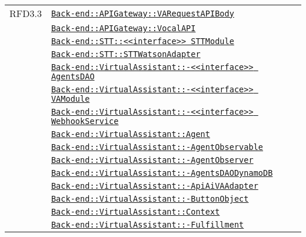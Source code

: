 \begin{longtable}{|>{\centering}m{3cm}|m{10cm}<{\centering}|}
RFD3.3 & \hyperref[Back-end::APIGateway::VARequestAPIBody]{\texttt{Back-end::APIGateway::VARequestAPIBody}}\\
& \hyperref[Back-end::APIGateway::VocalAPI]{\texttt{Back-end::APIGateway::VocalAPI}}\\
& \hyperref[Back-end::STT::<<interface>> STTModule]{\texttt{Back-end::STT::<<interface>> STTModule}}\\
& \hyperref[Back-end::STT::STTWatsonAdapter]{\texttt{Back-end::STT::STTWatsonAdapter}}\\
& \hyperref[Back-end::VirtualAssistant::<<interface>> AgentsDAO]{\texttt{Back-end::VirtualAssistant::-\linebreak <<interface>> AgentsDAO}}\\
& \hyperref[Back-end::VirtualAssistant::<<interface>> VAModule]{\texttt{Back-end::VirtualAssistant::-\linebreak <<interface>> VAModule}}\\
& \hyperref[Back-end::VirtualAssistant::<<interface>> WebhookService]{\texttt{Back-end::VirtualAssistant::-\linebreak <<interface>> WebhookService}}\\
& \hyperref[Back-end::VirtualAssistant::Agent]{\texttt{Back-end::VirtualAssistant::Agent}}\\
& \hyperref[Back-end::VirtualAssistant::AgentObservable]{\texttt{Back-end::VirtualAssistant::-\linebreak AgentObservable}}\\
& \hyperref[Back-end::VirtualAssistant::AgentObserver]{\texttt{Back-end::VirtualAssistant::-\linebreak AgentObserver}}\\
& \hyperref[Back-end::VirtualAssistant::AgentsDAODynamoDB]{\texttt{Back-end::VirtualAssistant::-\linebreak AgentsDAODynamoDB}}\\
& \hyperref[Back-end::VirtualAssistant::ApiAiVAAdapter]{\texttt{Back-end::VirtualAssistant::-\linebreak ApiAiVAAdapter}}\\
& \hyperref[Back-end::VirtualAssistant::ButtonObject]{\texttt{Back-end::VirtualAssistant::-\linebreak ButtonObject}}\\
& \hyperref[Back-end::VirtualAssistant::Context]{\texttt{Back-end::VirtualAssistant::Context}}\\
& \hyperref[Back-end::VirtualAssistant::Fulfillment]{\texttt{Back-end::VirtualAssistant::-\linebreak Fulfillment}}\\

\end{longtable}
